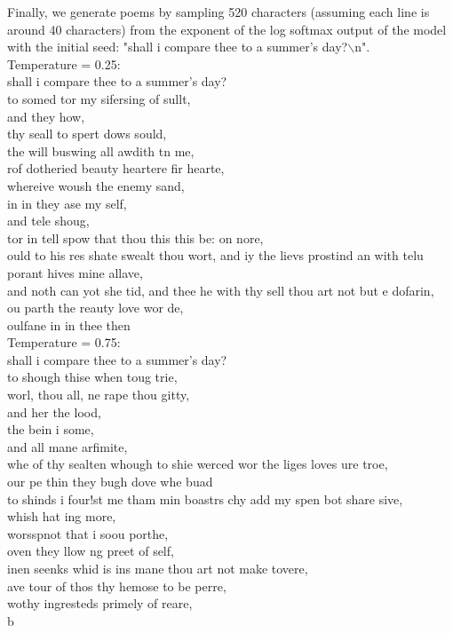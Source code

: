 \documentclass{article}
\begin{document}
Finally, we generate poems by sampling 520 characters (assuming each line is around 40 characters) from the exponent of the log softmax output of the model with the initial seed: "shall i compare thee to a summer's day?$\backslash$n".\\

Temperature = 0.25:\\
shall i compare thee to a summer's day?\\
to somed tor my sifersing of sullt,\\
and they how,\\
thy seall to spert dows sould,\\
the will buswing all awdith tn me,\\
rof dotheried beauty heartere fir hearte,\\
whereive woush the enemy sand,\\
in in they ase my self,\\
and tele shoug,\\
tor in tell spow that thou this this be: on nore,\\
ould to his res shate swealt thou wort, and iy the lievs prostind an with telu porant hives mine allave,\\
and noth can yot she tid, and thee he with thy sell thou art not but e dofarin,\\
ou parth the reauty love wor de,\\
oulfane in in thee then\\

Temperature = 0.75:\\
shall i compare thee to a summer's day?\\
to shough thise when toug trie,\\
worl, thou all, ne rape thou gitty,\\
and her the lood,\\
the bein i some,\\
and all mane arfimite,\\
whe of thy sealten whough to shie werced wor the liges loves ure troe,\\
our pe thin they bugh dove whe buad\\
to shinds i four!st me tham min boastrs chy add my spen bot share sive,\\
whish hat ing more,\\
worsspnot that i soou porthe,\\
oven they llow ng preet of self,\\
inen seenks whid is ins mane thou art not make tovere,\\
ave tour of thos thy hemose to be perre,\\
wothy ingresteds primely of reare,\\
b\\
\end{document}
